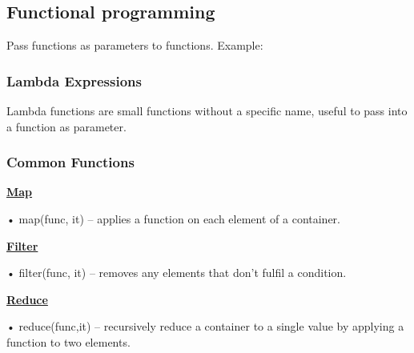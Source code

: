 \subsection{Functional programming}
    Pass functions as parameters to functions.
    Example:
    

    \subsubsection{Lambda Expressions}
        Lambda functions are small functions without a specific name, useful to pass into a function as parameter.
        
    
    \subsubsection{Common Functions}
        {\centering \underline{\textbf{Map}} \par}
        • map(func, it) – applies a function on each element of a container.
        
        {\centering \underline{\textbf{Filter}} \par}
        • filter(func, it) – removes any elements that don’t fulfil a condition.
        
        {\centering \underline{\textbf{Reduce}} \par}
        • reduce(func,it) – recursively reduce a container to a single value by applying a function to two elements.
        
        